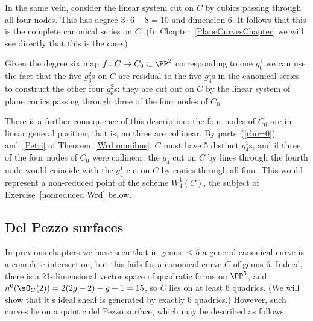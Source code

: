 In the same vein, consider the linear system cut on $C$ by cubics passing through all four nodes. This has degree $3\cdot 6 - 8 = 10$ and dimension 6. It follows that this is the complete canonical series on $C$. (In Chapter~\ref{PlaneCurvesChapter} we will see directly that this is the case.)

Given the degree six map $f : C \to C_0 \subset \PP^2$ corresponding to one $g^1_6$ we can use the fact that the five $g^2_6$s on $C$ are residual to the five $g^1_4$s in the canonical series to construct the other four $g^2_6$s: they are cut out on $C$ by the linear system of plane conics passing through three of the four nodes of $C_0$.

There is a further consequence of this description: the four nodes of $C_0$ are in linear general position; that is, no three are collinear. 
By parts~(\ref{rho=0}) and~\ref{Petri} of Theorem~\ref{Wrd omnibus}, $C$ must have 5 distinct $g^1_4$s, and if three of the four nodes of $C_0$ were collinear, the $g^1_4$ cut on $C$ by lines through the fourth node would coincide with the $g^1_4$ cut on $C$ by conics through all four. This would represent a non-reduced point of the scheme $W^1_4(C)$, the subject of Exercise~\ref{nonreduced Wrd} below. 

\subsection{Del Pezzo surfaces}

In previous chapters we have seen that in genus $\leq 5$ a general canonical curve is  a complete intersection, but this fails for a canonical curve $C$ of genus 6. Indeed, there is a 21-dimensional vector space of
quadratic forms on $\PP^5$, and $h^0(\sO_C(2)) = 2(2g-2)-g+1 = 15$, so $C$ lies on at least 6 quadrics. (We will show that it's ideal sheaf is generated by exactly 6 quadrics.) However, such curves lie on a quintic del Pezzo surface, which may be described as follows.

